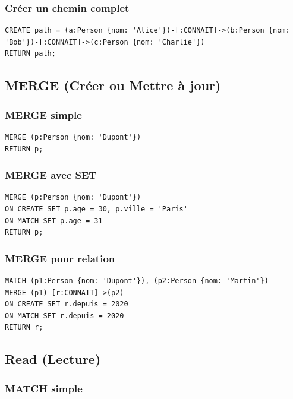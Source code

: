 \documentclass[11pt,a4paper]{article}
\begin{document}
\subsubsection{Créer un chemin complet}

\begin{lstlisting}
CREATE path = (a:Person {nom: 'Alice'})-[:CONNAIT]->(b:Person {nom: 'Bob'})-[:CONNAIT]->(c:Person {nom: 'Charlie'})
RETURN path;
\end{lstlisting}

\subsection{MERGE (Créer ou Mettre à jour)}

\subsubsection{MERGE simple}

\begin{lstlisting}
MERGE (p:Person {nom: 'Dupont'})
RETURN p;
\end{lstlisting}

\subsubsection{MERGE avec SET}

\begin{lstlisting}
MERGE (p:Person {nom: 'Dupont'})
ON CREATE SET p.age = 30, p.ville = 'Paris'
ON MATCH SET p.age = 31
RETURN p;
\end{lstlisting}

\subsubsection{MERGE pour relation}

\begin{lstlisting}
MATCH (p1:Person {nom: 'Dupont'}), (p2:Person {nom: 'Martin'})
MERGE (p1)-[r:CONNAIT]->(p2)
ON CREATE SET r.depuis = 2020
ON MATCH SET r.depuis = 2020
RETURN r;
\end{lstlisting}

\subsection{Read (Lecture)}

\subsubsection{MATCH simple}
\end{document}
